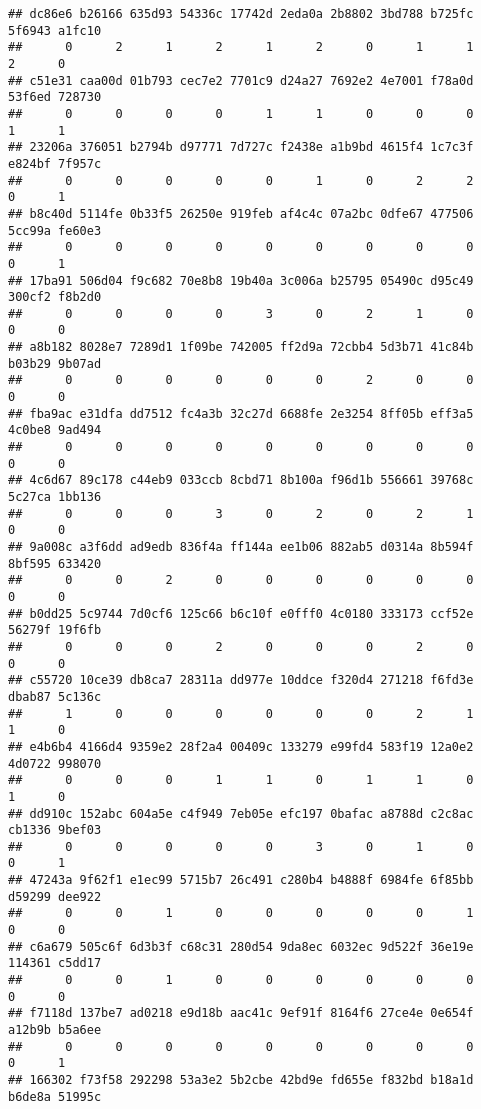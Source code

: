 \documentclass[
]{article}
\begin{document}
\begin{verbatim}
## dc86e6 b26166 635d93 54336c 17742d 2eda0a 2b8802 3bd788 b725fc 5f6943 a1fc10 
##      0      2      1      2      1      2      0      1      1      2      0 
## c51e31 caa00d 01b793 cec7e2 7701c9 d24a27 7692e2 4e7001 f78a0d 53f6ed 728730 
##      0      0      0      0      1      1      0      0      0      1      1 
## 23206a 376051 b2794b d97771 7d727c f2438e a1b9bd 4615f4 1c7c3f e824bf 7f957c 
##      0      0      0      0      0      1      0      2      2      0      1 
## b8c40d 5114fe 0b33f5 26250e 919feb af4c4c 07a2bc 0dfe67 477506 5cc99a fe60e3 
##      0      0      0      0      0      0      0      0      0      0      1 
## 17ba91 506d04 f9c682 70e8b8 19b40a 3c006a b25795 05490c d95c49 300cf2 f8b2d0 
##      0      0      0      0      3      0      2      1      0      0      0 
## a8b182 8028e7 7289d1 1f09be 742005 ff2d9a 72cbb4 5d3b71 41c84b b03b29 9b07ad 
##      0      0      0      0      0      0      2      0      0      0      0 
## fba9ac e31dfa dd7512 fc4a3b 32c27d 6688fe 2e3254 8ff05b eff3a5 4c0be8 9ad494 
##      0      0      0      0      0      0      0      0      0      0      0 
## 4c6d67 89c178 c44eb9 033ccb 8cbd71 8b100a f96d1b 556661 39768c 5c27ca 1bb136 
##      0      0      0      3      0      2      0      2      1      0      0 
## 9a008c a3f6dd ad9edb 836f4a ff144a ee1b06 882ab5 d0314a 8b594f 8bf595 633420 
##      0      0      2      0      0      0      0      0      0      0      0 
## b0dd25 5c9744 7d0cf6 125c66 b6c10f e0fff0 4c0180 333173 ccf52e 56279f 19f6fb 
##      0      0      0      2      0      0      0      2      0      0      0 
## c55720 10ce39 db8ca7 28311a dd977e 10ddce f320d4 271218 f6fd3e dbab87 5c136c 
##      1      0      0      0      0      0      0      2      1      1      0 
## e4b6b4 4166d4 9359e2 28f2a4 00409c 133279 e99fd4 583f19 12a0e2 4d0722 998070 
##      0      0      0      1      1      0      1      1      0      1      0 
## dd910c 152abc 604a5e c4f949 7eb05e efc197 0bafac a8788d c2c8ac cb1336 9bef03 
##      0      0      0      0      0      3      0      1      0      0      1 
## 47243a 9f62f1 e1ec99 5715b7 26c491 c280b4 b4888f 6984fe 6f85bb d59299 dee922 
##      0      0      1      0      0      0      0      0      1      0      0 
## c6a679 505c6f 6d3b3f c68c31 280d54 9da8ec 6032ec 9d522f 36e19e 114361 c5dd17 
##      0      0      1      0      0      0      0      0      0      0      0 
## f7118d 137be7 ad0218 e9d18b aac41c 9ef91f 8164f6 27ce4e 0e654f a12b9b b5a6ee 
##      0      0      0      0      0      0      0      0      0      0      1 
## 166302 f73f58 292298 53a3e2 5b2cbe 42bd9e fd655e f832bd b18a1d b6de8a 51995c 

\end{verbatim}
\end{document}
